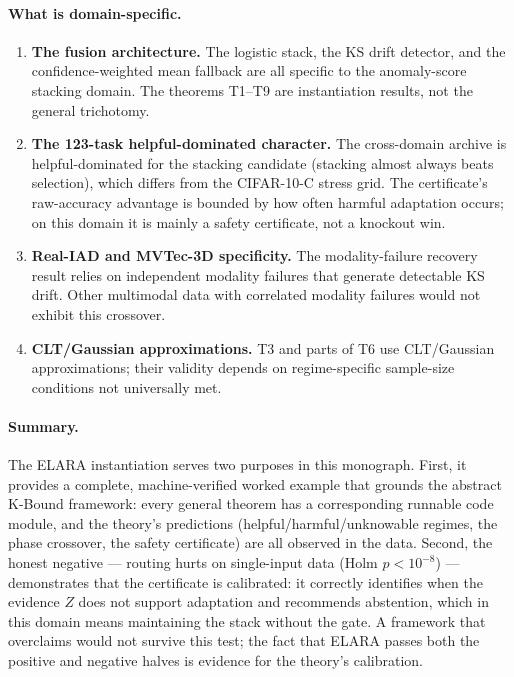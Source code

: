 \paragraph{What is domain-specific.}
\begin{enumerate}
\item \textbf{The fusion architecture.}  The logistic stack, the KS drift detector,
  and the confidence-weighted mean fallback are all specific to the anomaly-score
  stacking domain.  The theorems T1--T9 are instantiation results, not the general
  trichotomy.
\item \textbf{The 123-task helpful-dominated character.}  The cross-domain archive
  is helpful-dominated for the stacking candidate (stacking almost always beats
  selection), which differs from the CIFAR-10-C stress grid.  The certificate's
  raw-accuracy advantage is bounded by how often harmful adaptation occurs; on this
  domain it is mainly a safety certificate, not a knockout win.
\item \textbf{Real-IAD and MVTec-3D specificity.}  The modality-failure recovery
  result relies on independent modality failures that generate detectable KS drift.
  Other multimodal data with correlated modality failures would not exhibit this
  crossover.
\item \textbf{CLT/Gaussian approximations.}  T3 and parts of T6 use CLT/Gaussian
  approximations; their validity depends on regime-specific sample-size conditions
  not universally met.
\end{enumerate}

\paragraph{Summary.}
The ELARA instantiation serves two purposes in this monograph.  First, it provides
a complete, machine-verified worked example that grounds the abstract K-Bound
framework: every general theorem has a corresponding runnable code module, and the
theory's predictions (helpful/harmful/unknowable regimes, the phase crossover,
the safety certificate) are all observed in the data.  Second, the honest negative
--- routing hurts on single-input data (Holm $p{<}10^{-8}$) --- demonstrates that
the certificate is calibrated: it correctly identifies when the evidence $Z$ does
not support adaptation and recommends abstention, which in this domain means
maintaining the stack without the gate.  A framework that overclaims would not
survive this test; the fact that ELARA passes both the positive and negative halves
is evidence for the theory's calibration.

